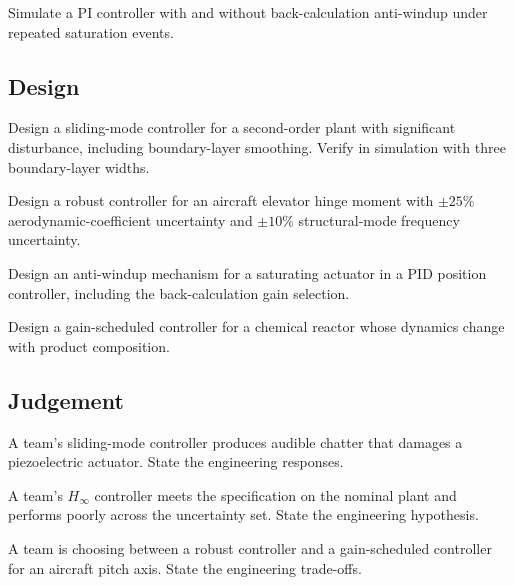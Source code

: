 \begin{exercise}
Simulate a PI controller with and without back-calculation anti-windup under repeated saturation events.
\end{exercise}

\subsection*{Design}

\begin{exercise}
Design a sliding-mode controller for a second-order plant with significant disturbance, including boundary-layer smoothing. Verify in simulation with three boundary-layer widths.
\end{exercise}

\begin{exercise}
Design a robust controller for an aircraft elevator hinge moment with $\pm 25\%$ aerodynamic-coefficient uncertainty and $\pm 10\%$ structural-mode frequency uncertainty.
\end{exercise}

\begin{exercise}
Design an anti-windup mechanism for a saturating actuator in a PID position controller, including the back-calculation gain selection.
\end{exercise}

\begin{exercise}
Design a gain-scheduled controller for a chemical reactor whose dynamics change with product composition.
\end{exercise}

\subsection*{Judgement}

\begin{exercise}
A team's sliding-mode controller produces audible chatter that damages a piezoelectric actuator. State the engineering responses.
\end{exercise}

\begin{exercise}
A team's $H_\infty$ controller meets the specification on the nominal plant and performs poorly across the uncertainty set. State the engineering hypothesis.
\end{exercise}

\begin{exercise}
A team is choosing between a robust controller and a gain-scheduled controller for an aircraft pitch axis. State the engineering trade-offs.
\end{exercise}

